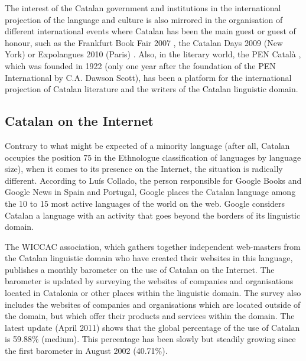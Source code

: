 \begin{multicols}{2}

The interest of the Catalan government and institutions in the international projection of the language and culture is also mirrored in the organisation of different international events where Catalan has been the main guest or guest of honour, such as the Frankfurt Book Fair 2007 \cite{CAT-Nota13}, the Catalan Days 2009 (New York) \cite{CAT-Nota14} or Expolangues 2010 (Paris) \cite{CAT-Nota15}. Also, in the literary world, the PEN Català \cite{CAT-Nota16}, which was founded in 1922 (only one year after the foundation of the PEN International by C.A. Dawson Scott), has been a platform for the international projection of Catalan literature and the writers of the Catalan linguistic domain.

\subsection{Catalan on the Internet}

Contrary to what might be expected of a minority language (after all, Catalan occupies the position 75 in the Ethnologue \cite{CAT-Nota17} classification of languages by language size), when it comes to its presence on the Internet, the situation is radically different. According to Luís Collado, the person responsible for Google Books and Google News in Spain and Portugal, Google places the Catalan language among the 10 to 15 most active languages of the world on the web. Google considers Catalan a language with an activity that goes beyond the borders of its linguistic domain.


The WICCAC \cite{CAT-Nota18} association, which gathers together independent web-masters from the Catalan linguistic domain who have created their websites in this language, publishes a monthly barometer on the use of Catalan on the Internet. The barometer is updated by surveying the websites of companies and organisations located in Catalonia or other places within the linguistic domain. The survey also includes the websites of companies and organisations which are located outside of the domain, but which offer their products and services within the domain. The latest update (April 2011) shows that the global percentage of the use of Catalan is 59.88\% (medium). This percentage has been slowly but steadily growing since the first barometer in August 2002 (40.71\%).


\end{multicols}

